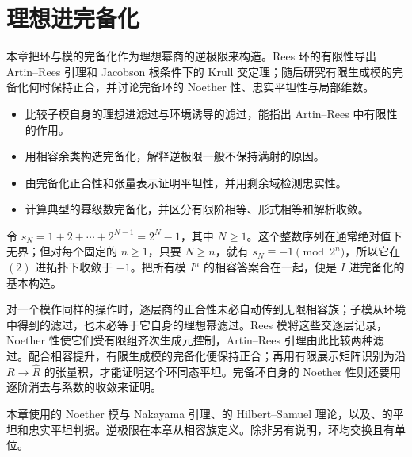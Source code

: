 
\chapter{理想进完备化}
\label{b3:ch:13}

\begin{chapterabstract}
	本章把环与模的完备化作为理想幂商的逆极限来构造。Rees 环的有限性导出 Artin–Rees 引理和 Jacobson 根条件下的 Krull 交定理；随后研究有限生成模的完备化何时保持正合，并讨论完备环的 Noether 性、忠实平坦性与局部维数。
\end{chapterabstract}

\begin{learninggoals}
	\begin{itemize}
		\item 比较子模自身的理想进滤过与环境诱导的滤过，能指出 Artin–Rees 中有限性的作用。
		\item 用相容余类构造完备化，解释逆极限一般不保持满射的原因。
		\item 由完备化正合性和张量表示证明平坦性，并用剩余域检测忠实性。
		\item 计算典型的幂级数完备化，并区分有限阶相等、形式相等和解析收敛。
	\end{itemize}
\end{learninggoals}

令 \(s_N=1+2+\cdots+2^{N-1}=2^N-1\)，其中 \(N\ge1\)。这个整数序列在通常绝对值下无界；但对每个固定的 \(n\ge1\)，只要 \(N\ge n\)，就有 \(s_N\equiv-1\pmod{2^n}\)，所以它在 \((2)\) 进拓扑下收敛于 \(-1\)。把所有模 \(I^n\) 的相容答案合在一起，便是 \(I\) 进完备化的基本构造。

\ProseParagraphBreak

对一个模作同样的操作时，逐层商的正合性未必自动传到无限相容族；子模从环境中得到的滤过，也未必等于它自身的理想幂滤过。Rees 模将这些交逐层记录，Noether 性使它们受有限组齐次生成元控制，Artin–Rees 引理由此比较两种滤过。配合相容提升，有限生成模的完备化便保持正合；再用有限展示矩阵识别为沿 \(R\to\widehat R\) 的张量积，才能证明这个环同态平坦。完备环自身的 Noether 性则还要用逐阶消去与系数的收敛来证明。

\ProseParagraphBreak

本章使用的 Noether 模与 Nakayama 引理、的 Hilbert–Samuel 理论，以及、的平坦和忠实平坦判据。逆极限在本章从相容族定义。除非另有说明，环均交换且有单位。


